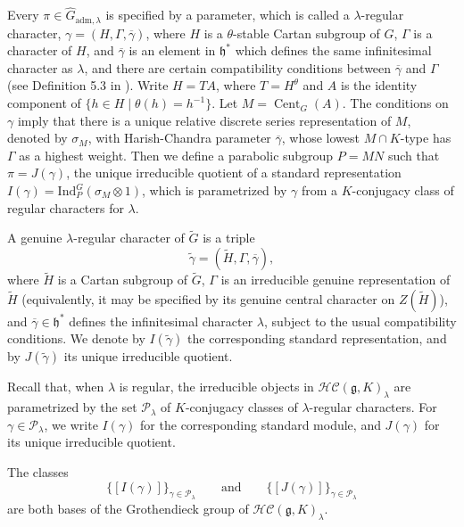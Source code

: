 \documentclass{amsart}
\newcommand{\fk}{\mathfrak}
\newcommand{\Ind}{{\mathrm{Ind}}}
\newcommand{\adm}{\mathrm{adm}}
\theoremstyle{definition}
\newcommand{\tu}{\widetilde}
\begin{document}
Every $\pi\in \widehat G_{\adm,\lambda}$ is  specified by a parameter, which is called a $\lambda$-regular character,  $\gamma=(H,\Gamma,\overline{ \gamma})$, where $H$ is a $\theta$-stable Cartan subgroup of $G$, $\Gamma$ is a character of $H$, and $\overline{\gamma}$ is an element in $\mathfrak{h}^{\ast}$ which defines the same infinitesimal character as $\lambda$, and there are  certain compatibility conditions between $ \overline{\gamma}$  and $\Gamma$ (see Definition 5.3 in \cite{AT12}). Write $H=TA$, where $T=H^{\theta}$ and $A$ is the identity component of $\{ h\in H \mid \theta (h)=h^{-1}\}$. Let $M=\operatorname{Cent}_G(A)$. The conditions on $\gamma$ imply that there is a unique relative discrete series representation of $M$, denoted by $\sigma_M$,
with Harish-Chandra parameter $\overline\gamma$, whose lowest $M\cap K$-type has $\Gamma$ as a highest weight. Then we define a parabolic subgroup $P=MN$ such that $\pi=J(\gamma)$, the unique irreducible quotient of a standard representation $I(\gamma)= \Ind _P ^G (\sigma _M \otimes 1)$, which is parametrized by $\gamma$ from a $K$-conjugacy class of regular characters for $\lambda$. 




A genuine $\lambda$-regular character of $\widetilde G$ is a triple
\begin{equation*}
\tu\gamma=(\widetilde H,\Gamma,\overline\gamma),
\end{equation*}
where $\widetilde H$ is a Cartan subgroup of $\widetilde G$, 
 $\Gamma$ is an irreducible genuine representation of $\tu H$
(equivalently, it may be specified by its genuine central character
on $Z(\tu H)$), and $\overline\gamma\in\mathfrak h^*$ defines the infinitesimal character $\lambda$, subject to the usual compatibility conditions. We denote by $I(\tu\gamma)$ the corresponding standard representation, and by $J(\tu \gamma)$ its unique irreducible quotient.




\medskip

Recall that, when $\lambda$ is regular, the irreducible objects in
$\mathcal{HC}(\fk g,K)_\lambda$ are parametrized by the set
$\mathcal P_\lambda$ of $K$-conjugacy classes of $\lambda$-regular characters.
For $\gamma\in\mathcal P_\lambda$, we write
$I(\gamma)$
for the corresponding standard module, and
$J(\gamma)$
for its unique irreducible quotient.

The classes
\[
\{[I(\gamma)]\}_{\gamma\in\mathcal P_\lambda}
\qquad\text{and}\qquad
\{[J(\gamma)]\}_{\gamma\in\mathcal P_\lambda}
\]
are both bases of the Grothendieck group of
$\mathcal{HC}(\fk g,K)_\lambda$.
\end{document}

